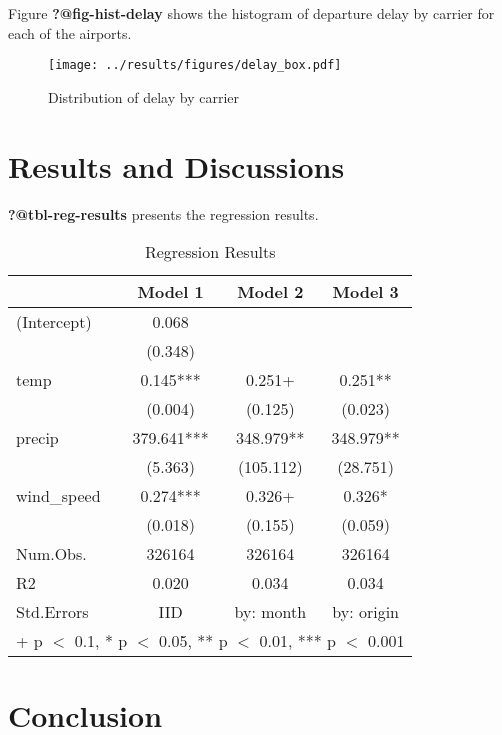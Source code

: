 \documentclass[
]{article}
\begin{document}
Figure \textbf{?@fig-hist-delay} shows the histogram of departure delay
by carrier for each of the airports.

\begin{figure}

{\centering \texttt{[image: ../results/figures/delay\_box.pdf]}

}

\caption{Distribution of delay by carrier}

\end{figure}%

\section{Results and Discussions}\label{results-and-discussions}

\textbf{?@tbl-reg-results} presents the regression results.

\begin{table}
\caption{Regression Results}\tabularnewline

\centering
\begin{tabular}[t]{lccc}
\toprule
  & Model 1 & Model 2 & Model 3\\
\midrule
(Intercept) & \num{0.068} &  & \\
 & (\num{0.348}) &  & \\
temp & \num{0.145}*** & \num{0.251}+ & \num{0.251}**\\
 & (\num{0.004}) & (\num{0.125}) & (\num{0.023})\\
precip & \num{379.641}*** & \num{348.979}** & \num{348.979}**\\
 & (\num{5.363}) & (\num{105.112}) & (\num{28.751})\\
wind\_speed & \num{0.274}*** & \num{0.326}+ & \num{0.326}*\\
 & (\num{0.018}) & (\num{0.155}) & (\num{0.059})\\
\midrule
Num.Obs. & \num{326164} & \num{326164} & \num{326164}\\
R2 & \num{0.020} & \num{0.034} & \num{0.034}\\
Std.Errors & IID & by: month & by: origin\\
\bottomrule
\multicolumn{4}{l}{\rule{0pt}{1em}+ p $<$ 0.1, * p $<$ 0.05, ** p $<$ 0.01, *** p $<$ 0.001}\\
\end{tabular}
\end{table}

\section{Conclusion}\label{conclusion}
\end{document}
